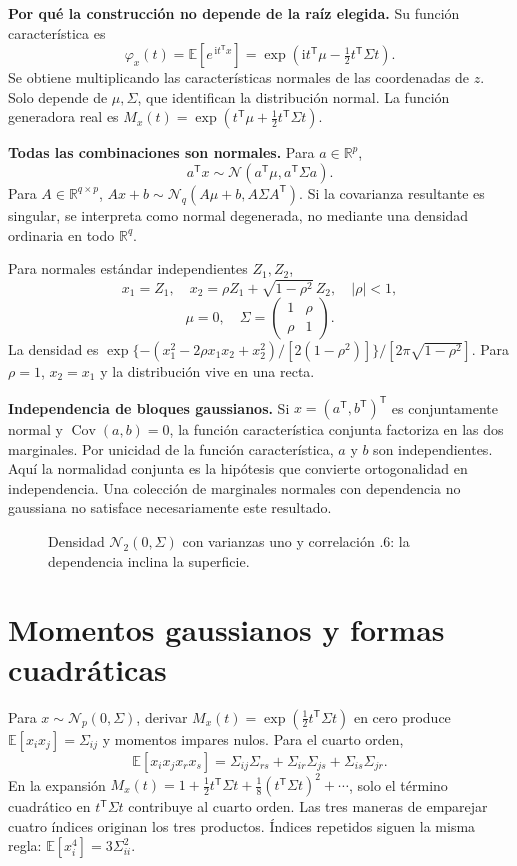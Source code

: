 \documentclass[11pt,a4paper]{article}
\newcommand{\R}{\mathbb R}
\newcommand{\E}{\mathbb E}
\newcommand{\T}{^{\mathsf T}}
\newcommand{\abs}[1]{\left\lvert #1\right\rvert}
\DeclareMathOperator{\Cov}{Cov}
\newcommand{\Normal}{\mathcal N}
\newcommand{\topic}[2]{\clearpage\section{#1}\label{#2}}
\theoremstyle{definition}\newtheorem{definicion}[teorema]{Definición}
\begin{document}
\textbf{Por qué la construcción no depende de la raíz elegida.}
Su función característica es
\[
\varphi_x(t)=\E[e^{\,\mathrm i t\T x}]
=\exp(\mathrm i t\T\mu-\tfrac12t\T\Sigma t).
\]
Se obtiene multiplicando las características normales de las coordenadas
de $z$. Solo depende de $\mu,\Sigma$, que identifican la distribución normal.
La función generadora real es
$M_x(t)=\exp(t\T\mu+\tfrac12t\T\Sigma t)$.

\textbf{Todas las combinaciones son normales.}
Para $a\in\R^p$,
\[
a\T x\sim\Normal(a\T\mu,a\T\Sigma a).
\]
Para $A\in\R^{q\times p}$,
$Ax+b\sim\Normal_q(A\mu+b,A\Sigma A\T)$.
Si la covarianza resultante es singular, se interpreta como normal
degenerada, no mediante una densidad ordinaria en todo $\R^q$.

\begin{ejemplo}
Para normales estándar independientes $Z_1,Z_2$,
\[
x_1=Z_1,\quad x_2=\rho Z_1+\sqrt{1-\rho^2}\,Z_2,\quad \abs\rho<1,
\]
\[
\mu=0,\quad \Sigma=\begin{pmatrix}1&\rho\\\rho&1\end{pmatrix}.
\]
La densidad es
$\exp\{-(x_1^2-2\rho x_1x_2+x_2^2)/[2(1-\rho^2)]\}
/[2\pi\sqrt{1-\rho^2}]$.
Para $\rho=1$, $x_2=x_1$ y la distribución vive en una recta.
\end{ejemplo}
\textbf{Independencia de bloques gaussianos.}
Si $x=(a\T,b\T)\T$ es conjuntamente normal y $\Cov(a,b)=0$,
la función característica conjunta factoriza en las dos marginales.
Por unicidad de la función característica, $a$ y $b$ son independientes.
Aquí la normalidad conjunta es la hipótesis que convierte
ortogonalidad en independencia.
Una colección de marginales normales con dependencia no gaussiana no
satisface necesariamente este resultado.


\begin{figure}[H]\centering
{}
\caption{Densidad $\Normal_2(0,\Sigma)$ con varianzas uno y correlación $.6$: la dependencia inclina la superficie.}
\end{figure}
\topic{Momentos gaussianos y formas cuadráticas}{s20}
Para $x\sim\Normal_p(0,\Sigma)$, derivar
$M_x(t)=\exp(\tfrac12t\T\Sigma t)$ en cero produce
$\E[x_ix_j]=\Sigma_{ij}$ y momentos impares nulos.
Para el cuarto orden,
\[
\boxed{\E[x_ix_jx_rx_s]
=\Sigma_{ij}\Sigma_{rs}+\Sigma_{ir}\Sigma_{js}
+\Sigma_{is}\Sigma_{jr}}.
\]
En la expansión $M_x(t)=1+\tfrac12t\T\Sigma t+
\tfrac18(t\T\Sigma t)^2+\cdots$, solo el término cuadrático en
$t\T\Sigma t$ contribuye al cuarto orden. Las tres maneras de emparejar
cuatro índices originan los tres productos. Índices repetidos siguen
la misma regla: $\E[x_i^4]=3\Sigma_{ii}^2$.
\end{document}
